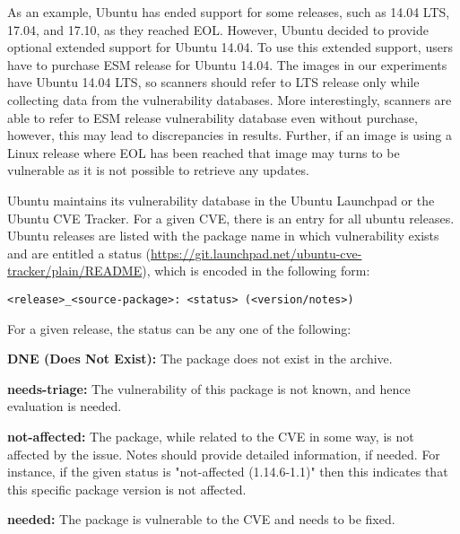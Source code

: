 As an example, Ubuntu has ended support for some releases, such as 14.04 LTS,
17.04, and 17.10, as they reached EOL. However, Ubuntu decided to provide optional extended support for Ubuntu 14.04.
To use this extended support, users have to purchase ESM release for Ubuntu 14.04.
The images in our experiments have Ubuntu 14.04 LTS, so scanners should refer
to LTS release only while collecting data from the vulnerability databases.
More interestingly, scanners are able to refer to ESM release vulnerability database
even without purchase, however, this may lead to discrepancies in results.
Further, if an image is using a Linux release where EOL has been reached that image may
turns to be vulnerable as it is not possible to retrieve any updates.

Ubuntu maintains its vulnerability database in the Ubuntu Launchpad or the Ubuntu CVE Tracker. For a given CVE, there is an entry for all ubuntu releases.
Ubuntu releases are listed with the package name
in which vulnerability exists and are entitled a status
(\href{https://git.launchpad.net/ubuntu-cve-tracker/plain/README}{https://git.launchpad.net/ubuntu-cve-tracker/plain/README}), which is
encoded in the following form:
\begin{verbatim}
<release>_<source-package>: <status> (<version/notes>)
\end{verbatim}
For a given release, the status can be any one of the following:

\noindent\textbf{DNE (Does Not Exist):} The package does not exist in the
                archive.

\noindent\textbf{needs-triage:} The vulnerability of this package
                is not known, and hence evaluation is needed.

\noindent\textbf{not-affected:} The package, while related to the
                CVE in some way, is not affected by the issue. Notes should
                provide detailed information, if needed. For instance, if the given
                status is "not-affected (1.14.6-1.1)" then this indicates that this specific
                package version is not affected.

\noindent\textbf{needed:} The package is vulnerable to the
                CVE and needs to be fixed.

